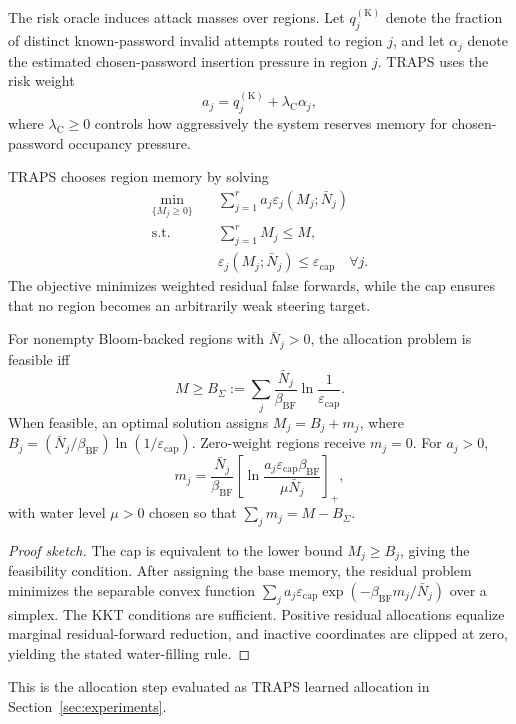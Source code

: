 The risk oracle induces attack masses over regions. Let \(q_j^{(\mathrm{K})}\) denote the fraction of distinct known-password invalid attempts routed to region \(j\), and let \(\alpha_j\) denote the estimated chosen-password insertion pressure in region \(j\). TRAPS uses the risk weight
\[
a_j
=
q_j^{(\mathrm{K})}
+
\lambda_{\mathrm{C}}\alpha_j,
\]
where \(\lambda_{\mathrm{C}}\ge 0\) controls how aggressively the system reserves memory for chosen-password occupancy pressure.

TRAPS chooses region memory by solving
\[
\begin{aligned}
\min_{\{M_j\ge 0\}}\quad
&\sum_{j=1}^{r} a_j\varepsilon_j(M_j;\bar N_j)\\
\text{s.t.}\quad
&\sum_{j=1}^{r}M_j\le M,\\
&\varepsilon_j(M_j;\bar N_j)\le \varepsilon_{\mathrm{cap}}
\quad \forall j .
\end{aligned}
\]
The objective minimizes weighted residual false forwards, while the cap ensures that no region becomes an arbitrarily weak steering target.

\begin{theorem}
For nonempty Bloom-backed regions with \(\bar N_j>0\), the allocation problem is feasible iff
\[
M\ge B_\Sigma
:=
\sum_j
\frac{\bar N_j}{\beta_{\mathrm{BF}}}
\ln\frac{1}{\varepsilon_{\mathrm{cap}}}.
\]
When feasible, an optimal solution assigns \(M_j=B_j+m_j\), where \(B_j=(\bar N_j/\beta_{\mathrm{BF}})\ln(1/\varepsilon_{\mathrm{cap}})\). Zero-weight regions receive \(m_j=0\). For \(a_j>0\),
\[
m_j
=
\frac{\bar N_j}{\beta_{\mathrm{BF}}}
\left[
\ln
\frac{a_j\varepsilon_{\mathrm{cap}}\beta_{\mathrm{BF}}}
{\mu\bar N_j}
\right]_+ ,
\]
with water level \(\mu>0\) chosen so that \(\sum_j m_j=M-B_\Sigma\).
\end{theorem}

\begin{proof}[Proof sketch]
The cap is equivalent to the lower bound \(M_j\ge B_j\), giving the feasibility condition. After assigning the base memory, the residual problem minimizes the separable convex function \(\sum_j a_j\varepsilon_{\mathrm{cap}}\exp(-\beta_{\mathrm{BF}}m_j/\bar N_j)\) over a simplex. The KKT conditions are sufficient. Positive residual allocations equalize marginal residual-forward reduction, and inactive coordinates are clipped at zero, yielding the stated water-filling rule.
\end{proof}

This is the allocation step evaluated as TRAPS learned allocation in Section~\ref{sec:experiments}.

